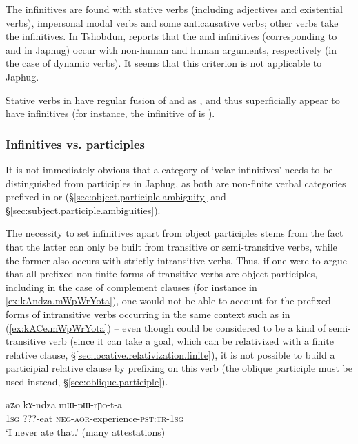 The  infinitives are found with stative verbs (including adjectives and existential verbs), impersonal modal verbs and some anticausative verbs; other verbs take the  infinitives. In Tshobdun, \citet[235]{sun14generic} reports that the  and  infinitives (corresponding to  and  in Japhug) occur with non-human and human arguments, respectively (in the case of dynamic verbs). It seems that this criterion is not applicable to Japhug.

Stative verbs in  have regular fusion of  and  as , and thus superficially appear to have  infinitives (for instance, the infinitive of  is  ).

\subsubsection{Infinitives vs. participles} \label{sec:infinitives.participles}
It is not immediately obvious that a category of `velar infinitives' needs to be distinguished from participles in Japhug, as both are non-finite verbal categories prefixed in  or  (§\ref{sec:object.participle.ambiguity} and §\ref{sec:subject.participle.ambiguities}). 

The necessity to set  infinitives apart from object participles stems from the fact that the latter can only be built from transitive or semi-transitive verbs, while the former also occurs with strictly intransitive verbs. Thus, if one were to argue that all prefixed non-finite forms of transitive verbs are object participles, including in the case of complement clauses (for instance  in \ref{ex:kAndza.mWpWrYota}), one would not be able to account for the prefixed forms of intransitive verbs occurring in the same context such as  in (\ref{ex:kACe.mWpWrYota}) -- even though  could be considered to be a kind of semi-transitive verb (since it can take a goal, which can be relativized with a finite relative clause, §\ref{sec:locative.relativization.finite}), it is not possible to build a participial relative clause by prefixing  on this verb (the oblique participle  must be used instead, §\ref{sec:oblique.participle}).

\begin{exe}
\ex \label{ex:kAndza.mWpWrYota}
\gll aʑo kɤ-ndza mɯ-pɯ-rɲo-t-a \\
\textsc{1sg} ???-eat \textsc{neg}-\textsc{aor}-experience-\textsc{pst}:\textsc{tr}-\textsc{1sg} \\
\glt `I never ate that.' (many attestations)
\end{exe}

